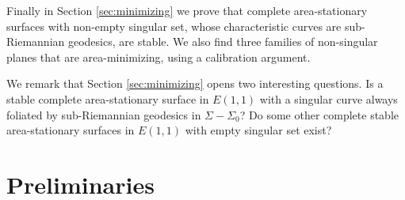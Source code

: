 \documentclass[10pt]{amsart}
\theoremstyle{definition}
\theoremstyle{remark}
\numberwithin{equation}{section}
\begin{document}
Finally in Section \ref{sec:minimizing} we prove that complete area-stationary surfaces with non-empty singular set, whose characteristic curves are sub-Riemannian geodesics, are stable. We also find three families of non-singular planes that are area-minimizing, using a calibration argument. 

We remark that Section \ref{sec:minimizing} opens two interesting questions. Is a stable complete area-stationary  surface in ${E(1,1)}$ with a singular curve  always foliated by sub-Riemannian geodesics in ${\Sigma}-{\Sigma}_0$? Do some  other complete stable area-stationary surfaces in ${E(1,1)}$ with empty singular set exist? 

\section{Preliminaries}
\label{sec:preliminaries}
\end{document}
